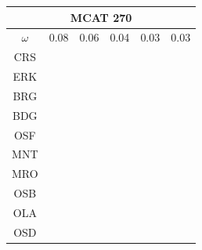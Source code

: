 \documentclass[12pt]{article}
\begin{document}
\begin{landscape}
\begin{figure}
\begin{minipage}[c]{0.3\textwidth}
\begin{tabular}{|c|c|c|c|c|c|}
         \hline \multicolumn{6}{|c|}{MCAT 270} \\ \hline                                                                              
         $\omega$&0.08&0.06&0.04&0.03&0.03 \\ \hline                                                                                  
        CRS&\cellcolor[HTML]{E41A1C}&\cellcolor[HTML]{E41A1C}&\cellcolor[HTML]{E41A1C}&\cellcolor[HTML]{E41A1C}&\cellcolor[HTML]{E41A1C} \\ \hline
        ERK&\cellcolor[HTML]{E41A1C}&\cellcolor[HTML]{E41A1C}&\cellcolor[HTML]{E41A1C}&\cellcolor[HTML]{E41A1C}&\cellcolor[HTML]{E41A1C} \\ \hline
        BRG&\cellcolor[HTML]{377EB8}&\cellcolor[HTML]{377EB8}&\cellcolor[HTML]{377EB8}&\cellcolor[HTML]{377EB8}&\cellcolor[HTML]{377EB8} \\ \hline       
        BDG&\cellcolor[HTML]{377EB8}&\cellcolor[HTML]{377EB8}&\cellcolor[HTML]{377EB8}&\cellcolor[HTML]{377EB8}&\cellcolor[HTML]{377EB8} \\ \hline       
        OSF&\cellcolor[HTML]{377EB8}&\cellcolor[HTML]{4DAF4A}&\cellcolor[HTML]{377EB8}&\cellcolor[HTML]{377EB8}&\cellcolor[HTML]{377EB8} \\ \hline       
        MNT&\cellcolor[HTML]{4DAF4A}&\cellcolor[HTML]{4DAF4A}&\cellcolor[HTML]{4DAF4A}&\cellcolor[HTML]{4DAF4A}&\cellcolor[HTML]{4DAF4A} \\ \hline       
        MRO&\cellcolor[HTML]{984EA3}&\cellcolor[HTML]{984EA3}&\cellcolor[HTML]{4DAF4A}&\cellcolor[HTML]{4DAF4A}&\cellcolor[HTML]{4DAF4A} \\ \hline       
        OSB&\cellcolor[HTML]{FF7F00}&\cellcolor[HTML]{984EA3}&\cellcolor[HTML]{984EA3}&\cellcolor[HTML]{4DAF4A}&\cellcolor[HTML]{4DAF4A} \\ \hline       
        OLA&\cellcolor[HTML]{FFFF33}&\cellcolor[HTML]{FF7F00}&\cellcolor[HTML]{FF7F00}&\cellcolor[HTML]{984EA3}&\cellcolor[HTML]{984EA3} \\ \hline       
        OSD&\cellcolor[HTML]{A65628}&\cellcolor[HTML]{FF7F00}&\cellcolor[HTML]{FFFF33}&\cellcolor[HTML]{FF7F00}&\cellcolor[HTML]{984EA3} \\ \hline       
\end{tabular}\\$~$\\$~$\\                                                                                                                                  
\begin{tabular}{|c|c|c|c|c|c|}                                                                                                                           

\end{tabular}
\end{minipage}
\end{figure}
\end{landscape}
\end{document}
